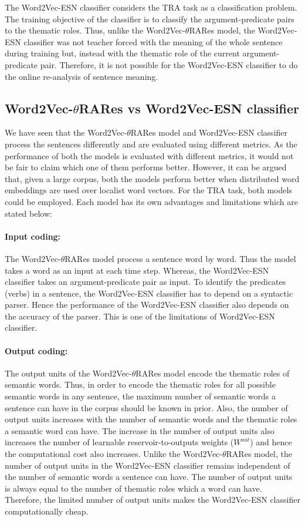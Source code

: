 The Word2Vec-ESN classifier considers the TRA task as a classification problem. The training objective of the classifier is to classify the argument-predicate pairs to the thematic roles. Thus, unlike the Word2Vec-$\theta$RARes model, the Word2Vec-ESN classifier was not teacher forced with the meaning of the whole sentence during training but, instead with the thematic role of the current argument-predicate pair. Therefore, it is not possible for the Word2Vec-ESN classifier to do the online re-analysis of sentence meaning.

\subsection{Word2Vec-$\theta$RARes vs Word2Vec-ESN classifier}

We have seen that the Word2Vec-$\theta$RARes model and Word2Vec-ESN classifier process the sentences differently and are evaluated using different metrics. As the performance of both the models is evaluated with different metrics, it would not be fair to claim which one of them performs better. However, it can be argued that, given a large corpus, both the models perform better when distributed word embeddings are used over localist word vectors. For the TRA task, both models could be employed. Each model has its own advantages and limitations which are stated below:

\paragraph{Input coding:} The Word2Vec-$\theta$RARes model process a sentence word by word. Thus the model takes a word as an input at each time step. Whereas, the Word2Vec-ESN classifier takes an argument-predicate pair as input. To identify the predicates (verbs) in a sentence, the Word2Vec-ESN classifier has to depend on a syntactic parser. Hence the performance of the Word2Vec-ESN classifier also depends on the accuracy of the parser. This is one of the limitations of Word2Vec-ESN classifier.

\paragraph{Output coding:} The output units of the Word2Vec-$\theta$RARes model encode the thematic roles of semantic words. Thus, in order to encode the thematic roles for all possible semantic words in any sentence, the maximum number of semantic words a sentence can have in the corpus should be known in prior. Also, the number of output units increases with the number of semantic words and the thematic roles a semantic word can have. The increase in the number of output units also increases the number of learnable reservoir-to-outputs weights ($W^{out}$) and hence the computational cost also increases. Unlike the Word2Vec-$\theta$RARes model, the number of output units in the Word2Vec-ESN classifier remains independent of the number of semantic words a sentence can have. The number of output units is always equal to the number of thematic roles which a word can have. Therefore, the limited number of output units makes the Word2Vec-ESN classifier computationally cheap. 

